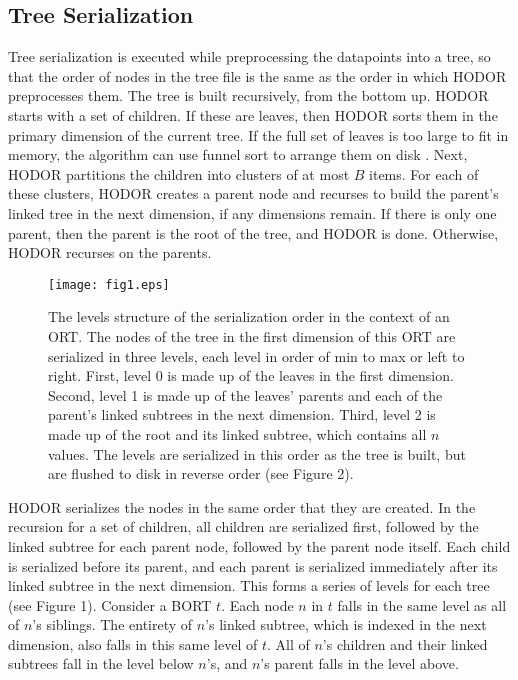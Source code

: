 \documentclass[11pt, oneside]{article}
\begin{document}
\subsection{Tree Serialization}

Tree serialization is executed while preprocessing the datapoints into a tree,
so that the order of nodes in the tree file is the same as the order in which
HODOR preprocesses them. The tree is built recursively, from the bottom up.
HODOR starts with a set of children. If these are leaves, then HODOR sorts them
in the primary dimension of the current tree. If the full set of leaves is too
large to fit in memory, the algorithm can use funnel sort to arrange them on
disk \cite{lecture9}. Next, HODOR partitions the children into clusters of at most $B$ items.
For each of these clusters, HODOR creates a parent node and recurses to build
the parent's linked tree in the next dimension, if any dimensions remain. If
there is only one parent, then the parent is the root of the tree, and HODOR is
done.  Otherwise, HODOR recurses on the parents.

\begin{figure}[h!]
    \centering
    \vspace{0.5in}
    \texttt{[image: fig1.eps]}
    \caption{
        The levels structure of the serialization order in the context of an
        ORT. The nodes of the tree in the first dimension of this ORT are
        serialized in three levels, each level in order of min to max or left
        to right. First, level 0 is made up of the leaves in the first
        dimension.  Second, level 1 is made up of the leaves' parents and each
        of the parent's linked subtrees in the next dimension. Third, level 2
        is made up of the root and its linked subtree, which contains all $n$
        values.  The levels are serialized in this order as the tree is built,
        but are flushed to disk in reverse order (see Figure 2).
    }
    \vspace{0.5in}
\end{figure}

HODOR serializes the nodes in the same order that they are created. In the
recursion for a set of children, all children are serialized first, followed by
the linked subtree for each parent node, followed by the parent node itself.
Each child is serialized before its parent, and each parent is serialized
immediately after its linked subtree in the next dimension. This forms a series
of levels \cite{seinfeld} for each tree (see Figure 1). Consider a BORT $t$.
Each node $n$ in $t$ falls in the same level as all of $n$'s siblings. The
entirety of $n$'s linked subtree, which is indexed in the next dimension, also
falls in this same level of $t$. All of $n$'s children and their linked subtrees
fall in the level below $n$'s, and $n$'s parent falls in the level above. 
\end{document}

